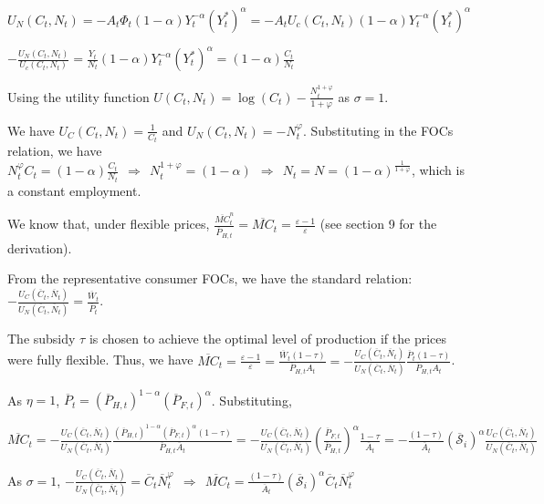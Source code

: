 \documentclass[
]{article}
\begin{document}
\(U_N(C_t,N_t) = -A_t \Phi_t (1-\alpha)Y_t^{-\alpha}(Y_t^*)^\alpha = -A_t U_c(C_t,N_t) (1-\alpha)Y_t^{-\alpha}(Y_t^*)^\alpha\)

\(\displaystyle -\frac{U_N(C_t,N_t)}{U_c(C_t,N_t)} = \frac{Y_t}{N_t} (1-\alpha)Y_t^{-\alpha}(Y_t^*)^\alpha=(1-\alpha) \frac{C_t}{N_t}\)

Using the utility function
\(\displaystyle U(C_t,N_t)=\log(C_t)-\frac{N_t^{1+\varphi}}{1+\varphi}\)
as \(\sigma=1\).

We have \(\displaystyle U_C(C_t,N_t)=\frac{1}{C_t}\) and
\(\displaystyle U_N(C_t,N_t)=-N_t^\varphi\). Substituting in the FOCs
relation, we have
\(\displaystyle N_t^\varphi C_t=(1-\alpha)\frac{C_t}{N_t} \ \ \Rightarrow \ \ N_t^{1+\varphi}=(1-\alpha) \ \ \Rightarrow \ \ N_t = N = (1-\alpha)^{\frac{1}{1+\varphi}}\),
which is a constant employment.

We know that, under flexible prices,
\(\displaystyle \frac{\overline{MC}_t^n}{\overline{P}_{H,t}}=\overline{MC}_t=\frac{\varepsilon-1}{\varepsilon}\)
(see section 9 for the derivation).

From the representative consumer FOCs, we have the standard relation:
\(\displaystyle -\frac{U_C(\overline{C}_t,\overline{N}_t)}{U_N(\overline{C}_t,\overline{N}_t)}=\frac{\overline{W}_t}{\overline{P}_t}\).

The subsidy \(\tau\) is chosen to achieve the optimal level of
production if the prices were fully flexible. Thus, we have
\(\displaystyle \overline{MC}_t=\frac{\varepsilon-1}{\varepsilon}=\frac{\overline{W}_t (1-\tau)}{\overline{P}_{H,t} A_t}=-\frac{U_C(\overline{C}_t,\overline{N}_t)}{U_N(\overline{C}_t,\overline{N}_t)}\frac{\overline{P}_t (1-\tau)}{\overline{P}_{H,t} A_t}\).

As \(\eta=1\),
\(\overline{P}_t=(\overline{P}_{H,t})^{1-\alpha}(\overline{P}_{F,t})^\alpha\).
Substituting,

\(\displaystyle \overline{MC}_t= -\frac{U_C(\overline{C}_t,\overline{N}_t)}{U_N(\overline{C}_t,\overline{N}_t)}\frac{(\overline{P}_{H,t})^{1-\alpha}(\overline{P}_{F,t})^\alpha (1-\tau)}{\overline{P}_{H,t} \overline{A}_t}= -\frac{U_C(\overline{C}_t,\overline{N}_t)}{U_N(\overline{C}_t,\overline{N}_t)} \left( \frac{\overline{P}_{F,t}}{\overline{P}_{H,t}} \right)^\alpha \frac{1-\tau}{\overline{A}_t}= -\frac{(1-\tau)}{\overline{A}_t} (\mathcal{\overline{S}}_i)^\alpha \frac{U_C(\overline{C}_t,\overline{N}_t)}{U_N(\overline{C}_t,\overline{N}_t)}\)

As \(\sigma=1\),
\(\displaystyle -\frac{U_C(\overline{C}_t,\overline{N}_t)}{U_N(\overline{C}_t,\overline{N}_t)}=\overline{C}_t \overline{N}_t^\varphi \ \ \Rightarrow \ \ \overline{MC}_t= \frac{(1-\tau)}{\overline{A}_t} (\mathcal{\overline{S}}_i)^\alpha \overline{C}_t \overline{N}_t^\varphi\)
\end{document}

